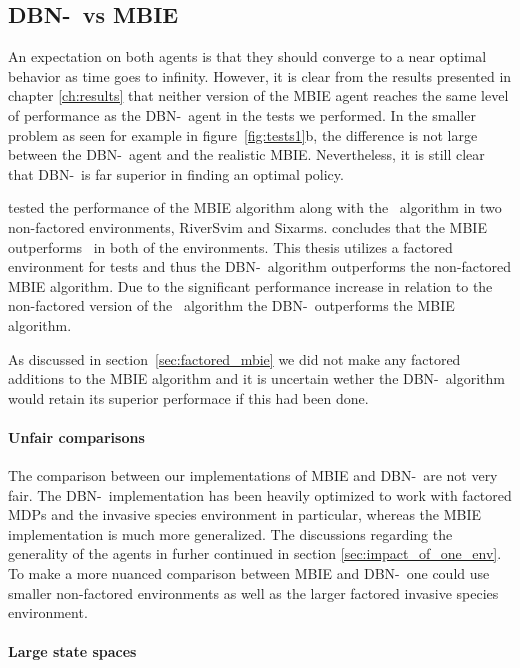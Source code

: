 \subsection{DBN-\etre\ vs MBIE}
\label{sec:dbn_vs_mbie}

An expectation on both agents is that they should converge to a near optimal
behavior as time goes to infinity. However, it is clear from the results
presented in chapter \ref{ch:results} that neither version of the MBIE agent
reaches the same level of performance as the DBN-\etre\ agent in the tests we
performed. In the smaller problem as seen for example in
figure~\ref{fig:tests1}b, the difference is not large between the DBN-\etre\ agent
and the realistic MBIE. Nevertheless, it is still clear that DBN-\etre\ is far
superior in finding an optimal policy.

\textcite{strehl2004empirical} tested the performance of the MBIE algorithm
along with the \etre\ algorithm in two non-factored environments, RiverSvim and
Sixarms. \textcite{strehl2004empirical} concludes that the MBIE outperforms
\etre\ in both of the environments. This thesis utilizes a factored environment
for tests and thus the DBN-\etre\ algorithm outperforms the non-factored MBIE
algorithm. Due to the significant performance increase in relation to the
non-factored version of the \etre\ algorithm the DBN-\etre\ outperforms the
MBIE algorithm.

As discussed in section~\ref{sec:factored_mbie} we did not make any factored
additions to the MBIE algorithm and it is uncertain wether the DBN-\etre\
algorithm would retain its superior performace if this had been done.

\paragraph{Unfair comparisons}

The comparison between our implementations of MBIE and DBN-\etre\ are not very
fair. The DBN-\etre\ implementation has been heavily optimized to work with
factored MDPs and the invasive species environment in particular, whereas the
MBIE implementation is much more generalized. The discussions regarding the
generality of the agents in furher continued in section
\ref{sec:impact_of_one_env}. To make a more nuanced comparison between MBIE and
DBN-\etre\ one could use smaller non-factored environments as well as the
larger factored invasive species environment.


\paragraph{Large state spaces}

